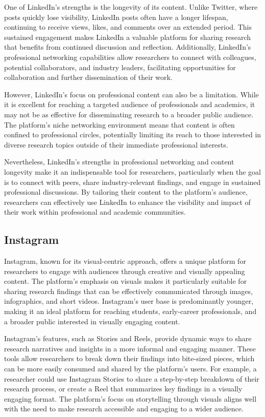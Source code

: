 \documentclass[
]{book}
\begin{document}
One of LinkedIn's strengths is the longevity of its content. Unlike Twitter, where posts quickly lose visibility, LinkedIn posts often have a longer lifespan, continuing to receive views, likes, and comments over an extended period. This sustained engagement makes LinkedIn a valuable platform for sharing research that benefits from continued discussion and reflection. Additionally, LinkedIn's professional networking capabilities allow researchers to connect with colleagues, potential collaborators, and industry leaders, facilitating opportunities for collaboration and further dissemination of their work.

However, LinkedIn's focus on professional content can also be a limitation. While it is excellent for reaching a targeted audience of professionals and academics, it may not be as effective for disseminating research to a broader public audience. The platform's niche networking environment means that content is often confined to professional circles, potentially limiting its reach to those interested in diverse research topics outside of their immediate professional interests.

Nevertheless, LinkedIn's strengths in professional networking and content longevity make it an indispensable tool for researchers, particularly when the goal is to connect with peers, share industry-relevant findings, and engage in sustained professional discussions. By tailoring their content to the platform's audience, researchers can effectively use LinkedIn to enhance the visibility and impact of their work within professional and academic communities.

\subsection*{Instagram}\label{instagram}

Instagram, known for its visual-centric approach, offers a unique platform for researchers to engage with audiences through creative and visually appealing content. The platform's emphasis on visuals makes it particularly suitable for sharing research findings that can be effectively communicated through images, infographics, and short videos. Instagram's user base is predominantly younger, making it an ideal platform for reaching students, early-career professionals, and a broader public interested in visually engaging content.

Instagram's features, such as Stories and Reels, provide dynamic ways to share research narratives and insights in a more informal and engaging manner. These tools allow researchers to break down their findings into bite-sized pieces, which can be more easily consumed and shared by the platform's users. For example, a researcher could use Instagram Stories to share a step-by-step breakdown of their research process, or create a Reel that summarizes key findings in a visually engaging format. The platform's focus on storytelling through visuals aligns well with the need to make research accessible and engaging to a wider audience.
\end{document}
